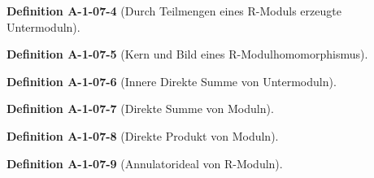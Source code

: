 \documentclass[10pt, letterpaper]{article}
\newcommand{\CustomHeading}[3]{%
  \par\medskip\noindent%
  \textbf{#1 #2} \textnormal{(#3)}.\enskip%
}
\newenvironment{DEF}[2]{\CustomHeading{Definition}{#1}{#2}}{}
\begin{document}
\begin{DEF}{A-1-07-4}{Durch Teilmengen eines R-Moduls erzeugte Untermoduln}

\end{DEF}

\begin{DEF}{A-1-07-5}{Kern und Bild eines R-Modulhomomorphismus}

\end{DEF}

\begin{DEF}{A-1-07-6}{Innere Direkte Summe von Untermoduln}

\end{DEF}

\begin{DEF}{A-1-07-7}{Direkte Summe von Moduln}

\end{DEF}

\begin{DEF}{A-1-07-8}{Direkte Produkt von Moduln}

\end{DEF}

\begin{DEF}{A-1-07-9}{Annulatorideal von R-Moduln}

\end{DEF}


























\pagebreak
\printbibliography
\end{document}
